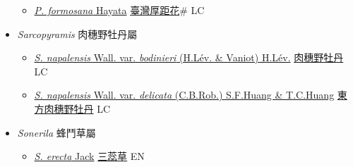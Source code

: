 \begin{itemize}
  \begin{itemize}
        \item[] \href{http://www.theplantlist.org/tpl1.1/search?q=Pachycentria+formosana}{\textit{P. formosana} Hayata}   \href{\detokenize{http://taibnet.sinica.edu.tw/chi/taibnet_species_list.php?T2=臺灣厚距花&T2_new_value=true&fr=y}}{臺灣厚距花}\# LC
  \end{itemize}
 \item[] \textit{Sarcopyramis} 肉穗野牡丹屬
                    
  \begin{itemize}
        \item[] \href{http://www.theplantlist.org/tpl1.1/search?q=Sarcopyramis+napalensis+var.+bodinieri}{\textit{S. napalensis} Wall. var. \textit{bodinieri} (H.Lév. \& Vaniot) H.Lév.}   \href{\detokenize{http://taibnet.sinica.edu.tw/chi/taibnet_species_list.php?T2=肉穗野牡丹&T2_new_value=true&fr=y}}{肉穗野牡丹} LC
        \item[] \href{http://www.theplantlist.org/tpl1.1/search?q=Sarcopyramis+napalensis+var.+delicata}{\textit{S. napalensis} Wall. var. \textit{delicata} (C.B.Rob.) S.F.Huang \& T.C.Huang}   \href{\detokenize{http://taibnet.sinica.edu.tw/chi/taibnet_species_list.php?T2=東方肉穗野牡丹&T2_new_value=true&fr=y}}{東方肉穗野牡丹} LC
  \end{itemize}
 \item[] \textit{Sonerila} 蜂鬥草屬
                    
  \begin{itemize}
        \item[] \href{http://www.theplantlist.org/tpl1.1/search?q=Sonerila+erecta}{\textit{S. erecta} Jack}     \href{\detokenize{http://taibnet.sinica.edu.tw/chi/taibnet_species_list.php?T2=三蕊草&T2_new_value=true&fr=y}}{三蕊草} EN
  \end{itemize}
  \end{itemize}
